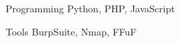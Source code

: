 

\begin{cvskills}

  \cvskill
    {Programming} %
    {Python, PHP, JavaScript} %

  \cvskill
    {Tools} %
    {BurpSuite, Nmap, FFuF} %
    
\end{cvskills}
